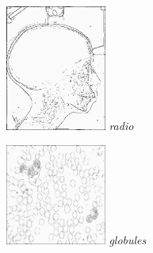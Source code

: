 \documentclass[a4,12pt]{article}
\begin{document}
\begin{minipage}[c]{0.20\linewidth}
	\begin{center}
		\includegraphics[width = 33mm]{./img/p2test_grad_fin_radio.jpg}
		\textit{radio}
	\end{center}
\end{minipage}
\begin{minipage}[c]{0.20\linewidth}
	\begin{center}
		\includegraphics[width = 33mm]{./img/p2test_grad_fin_globules_t10.jpg}
		\textit{globules}
	\end{center}
\end{minipage}
\end{document}
